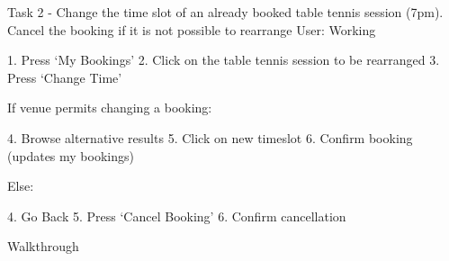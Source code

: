 ﻿Task 2 - Change the time slot of an already booked table tennis session (7pm). Cancel the booking if it is not possible to rearrange
 User: Working
 
1.    Press ‘My Bookings’
2.    Click on the table tennis session to be rearranged
3.    Press ‘Change Time’
 
If venue permits changing a booking:
 
4.    Browse alternative results
5.    Click on new timeslot
6.    Confirm booking (updates my bookings)
 
Else:
 
4.    Go Back
5.    Press ‘Cancel Booking’
6.    Confirm cancellation
 
 
Walkthrough